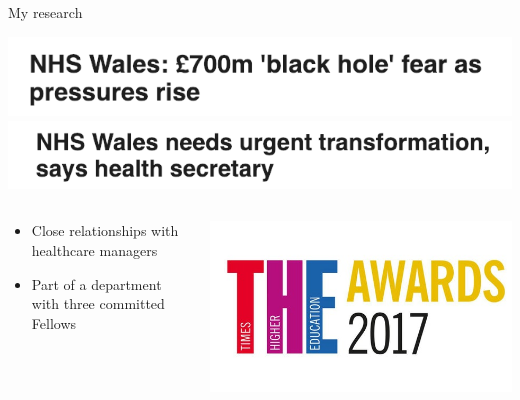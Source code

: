 \documentclass{beamer}
\begin{document}
\begin{frame}{My research}
    \begin{minipage}{\textwidth}
        \raggedright%
        \includegraphics[width=.75\linewidth]{blackhole.png}\\
        \vspace{10pt}
        \includegraphics[width=.75\linewidth]{transform.png}
    \end{minipage}

    \vspace{30pt}

    \begin{minipage}{\textwidth}
        \begin{columns}[T]
            \begin{column}{.5\linewidth}
                \begin{itemize}
                    \item Close relationships with healthcare managers
                    \item Part of a department with three committed Fellows
                \end{itemize}
            \end{column}
            \begin{column}{.5\linewidth}
                \includegraphics[width=\linewidth]{theawards.jpg}
            \end{column}
        \end{columns}
    \end{minipage}
\end{frame}
\end{document}
